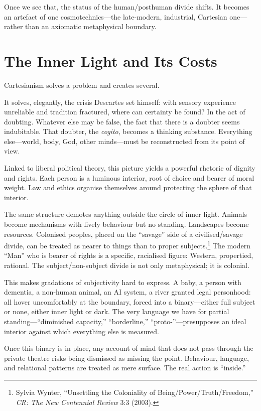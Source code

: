 \documentclass[12pt,a4paper]{article}
\begin{document}
Once we see that, the status of the human/posthuman divide shifts. It becomes an artefact of one cosmotechnics---the late-modern, industrial, Cartesian one---rather than an axiomatic metaphysical boundary.

\section{The Inner Light and Its Costs}

Cartesianism solves a problem and creates several.

It solves, elegantly, the crisis Descartes set himself: with sensory experience unreliable and tradition fractured, where can certainty be found? In the act of doubting. Whatever else may be false, the fact that there is a doubter seems indubitable. That doubter, the \emph{cogito}, becomes a thinking substance. Everything else---world, body, God, other minds---must be reconstructed from its point of view.

Linked to liberal political theory, this picture yields a powerful rhetoric of dignity and rights. Each person is a luminous interior, root of choice and bearer of moral weight. Law and ethics organise themselves around protecting the sphere of that interior.

The same structure demotes anything outside the circle of inner light. Animals become mechanisms with lively behaviour but no standing. Landscapes become resources. Colonised peoples, placed on the ``savage'' side of a civilised/savage divide, can be treated as nearer to things than to proper subjects.\footnote{Sylvia Wynter, ``Unsettling the Coloniality of Being/Power/Truth/Freedom,'' \emph{CR: The New Centennial Review} 3:3 (2003).} The modern ``Man'' who is bearer of rights is a specific, racialised figure: Western, propertied, rational. The subject/non-subject divide is not only metaphysical; it is colonial.

This makes gradations of subjectivity hard to express. A baby, a person with dementia, a non-human animal, an AI system, a river granted legal personhood: all hover uncomfortably at the boundary, forced into a binary---either full subject or none, either inner light or dark. The very language we have for partial standing---``diminished capacity,'' ``borderline,'' ``proto-''---presupposes an ideal interior against which everything else is measured.

Once this binary is in place, any account of mind that does not pass through the private theatre risks being dismissed as missing the point. Behaviour, language, and relational patterns are treated as mere surface. The real action is ``inside.''
\end{document}

